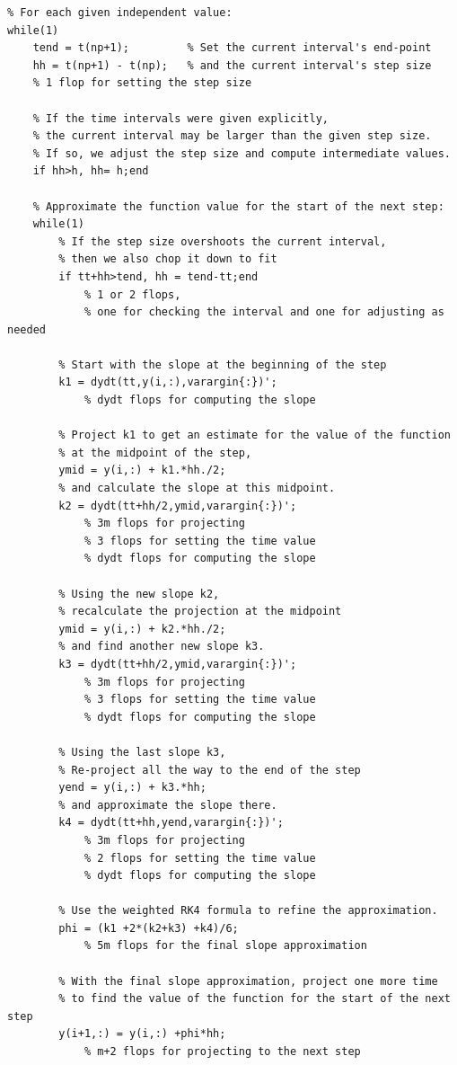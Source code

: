 \documentclass{article}
\begin{document}
\begin{lstlisting}
% For each given independent value:
while(1)
    tend = t(np+1);         % Set the current interval's end-point
    hh = t(np+1) - t(np);   % and the current interval's step size
    % 1 flop for setting the step size
    
    % If the time intervals were given explicitly, 
    % the current interval may be larger than the given step size.
    % If so, we adjust the step size and compute intermediate values.
    if hh>h, hh= h;end
    
    % Approximate the function value for the start of the next step:
    while(1)
        % If the step size overshoots the current interval,
        % then we also chop it down to fit
        if tt+hh>tend, hh = tend-tt;end
            % 1 or 2 flops, 
            % one for checking the interval and one for adjusting as needed
        
        % Start with the slope at the beginning of the step
        k1 = dydt(tt,y(i,:),varargin{:})';
            % dydt flops for computing the slope
        
        % Project k1 to get an estimate for the value of the function
        % at the midpoint of the step,
        ymid = y(i,:) + k1.*hh./2;        
        % and calculate the slope at this midpoint.
        k2 = dydt(tt+hh/2,ymid,varargin{:})';
            % 3m flops for projecting
            % 3 flops for setting the time value
            % dydt flops for computing the slope
        
        % Using the new slope k2, 
        % recalculate the projection at the midpoint
        ymid = y(i,:) + k2.*hh./2;        
        % and find another new slope k3.
        k3 = dydt(tt+hh/2,ymid,varargin{:})';
            % 3m flops for projecting
            % 3 flops for setting the time value
            % dydt flops for computing the slope
        
        % Using the last slope k3,
        % Re-project all the way to the end of the step
        yend = y(i,:) + k3.*hh;
        % and approximate the slope there.
        k4 = dydt(tt+hh,yend,varargin{:})';
            % 3m flops for projecting
            % 2 flops for setting the time value
            % dydt flops for computing the slope
        
        % Use the weighted RK4 formula to refine the approximation.
        phi = (k1 +2*(k2+k3) +k4)/6;
            % 5m flops for the final slope approximation
        
        % With the final slope approximation, project one more time 
        % to find the value of the function for the start of the next step
        y(i+1,:) = y(i,:) +phi*hh;
            % m+2 flops for projecting to the next step
        

\end{lstlisting}
\end{document}

